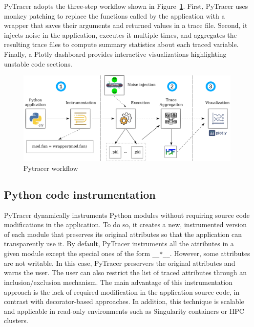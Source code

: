 \documentclass[11pt]{article}
\newcommand{\tristan}[1]{\color{orange}\textbf{From Tristan:} #1\color{black}\xspace}
\newcommand{\pytracer}[0]{PyTracer\xspace}
\begin{document}
\pytracer adopts the three-step workflow shown in Figure~\ref{fig:workflow}. First, \pytracer uses monkey patching to replace the functions called by the application with a wrapper that saves their arguments and returned values in a trace file.  Second, it injects noise in the application, executes it multiple times, and aggregates the resulting trace files to compute summary statistics about each traced variable. Finally, a Plotly dashboard provides interactive visualizations highlighting unstable code sections.


\begin{figure}
    \centering
    \includegraphics[width=\linewidth]{figure/workflow.pdf}
    \caption{Pytracer workflow}
    \label{fig:workflow}
\end{figure}

\subsection{Python code instrumentation}



\pytracer dynamically instruments Python modules
without requiring source code modifications in the application.
To do so, it creates a new, instrumented version of each module that preserves its original attributes so that the application can transparently use it.
By default, \pytracer instruments all the attributes
in a given module except the special ones of the form \texttt{\_\_*\_\_}.
However, some attributes are not writable. In this case, \pytracer preservers the original attributes and warns the user. The user can also restrict the list of traced attributes through
an inclusion/exclusion mechanism. The main advantage of this instrumentation approach is the lack of required modification in the application source code, in contrast with decorator-based approaches. In addition, this technique is scalable and applicable in read-only environments such as Singularity containers or HPC clusters.
\end{document}
